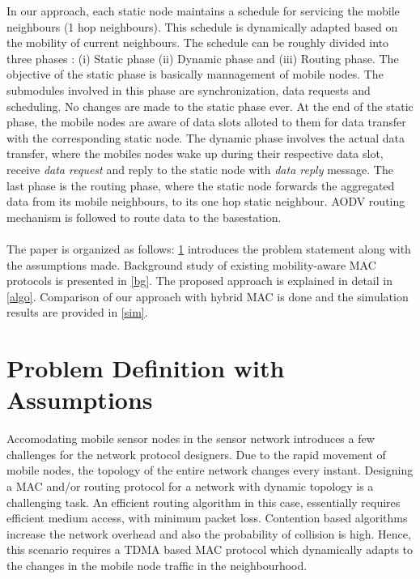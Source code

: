 \documentclass[a4paper, conference, 10pt]{IEEEtran}
\begin{document}
In our approach, each static node maintains a schedule for servicing the mobile neighbours (1 hop neighbours). This schedule is dynamically adapted based on the mobility of current neighbours. The schedule can be roughly divided into three phases : (i) Static phase (ii) Dynamic phase and (iii) Routing phase. The objective of the static phase is basically mannagement of mobile nodes. The submodules involved in this phase are synchronization, data requests and scheduling. No changes are made to the static phase ever. At the end of the static phase, the mobile nodes are aware of data slots alloted to them for data transfer with the corresponding static node. The dynamic phase involves the actual data transfer, where the mobiles nodes wake up during their respective data slot, receive \emph{data request} and reply to the static node with \emph{data reply} message. The last phase is the routing phase, where the static node forwards the aggregated data from its mobile neighbours, to its one hop static neighbour. AODV routing mechanism \cite{aodv} is followed to route data to the basestation.\\\\

The paper is organized as follows: \ref{prob_def} introduces the problem statement along with the assumptions made. Background study of existing mobility-aware MAC protocols is presented in \ref{bg}. The proposed approach is explained in detail in \ref{algo}. Comparison of our approach with hybrid MAC\cite{hmac} is done and the simulation results are provided in \ref{sim}. 

\section{Problem Definition with Assumptions}
\label{prob_def}
Accomodating mobile sensor nodes in the sensor network introduces a few challenges for the network protocol designers. Due to the rapid movement of mobile nodes, the topology of the entire network changes every instant. Designing a MAC and/or routing protocol for a network with dynamic topology is a challenging task. An efficient routing algorithm in this case, essentially requires efficient medium access, with minimum packet loss. Contention based algorithms increase the network overhead and also the probability of collision is high. Hence, this scenario requires a TDMA based MAC protocol which dynamically adapts to the changes in the mobile node traffic in the neighbourhood.  %
\end{document}
